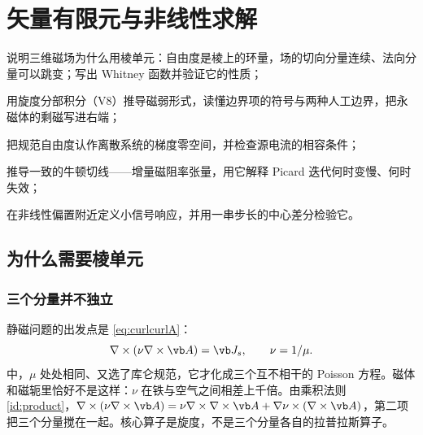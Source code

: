 \chapter{矢量有限元与非线性求解}\label{ch:femvector}

\begin{chapterguide}
\begin{guidegoals}
\item 说明三维磁场为什么用棱单元：自由度是棱上的环量，场的切向分量连续、法向分量可以跳变；写出 Whitney 函数并验证它的性质；
\item 用旋度分部积分（V8）推导磁弱形式，读懂边界项的符号与两种人工边界，把永磁体的剩磁写进右端；
\item 把规范自由度认作离散系统的梯度零空间，并检查源电流的相容条件；
\item 推导一致的牛顿切线——增量磁阻率张量，用它解释 Picard 迭代何时变慢、何时失效；
\item 在非线性偏置附近定义小信号响应，并用一串步长的中心差分检验它。
\end{guidegoals}
\end{chapterguide}

\section{为什么需要棱单元}\label{sec:femvector-edge}

\subsection{三个分量并不独立}
静磁问题的出发点是 \eqref{eq:curlcurlA}：
\begin{equation*}
\nabla\times(\nu\nabla\times\vb A)=\vb J_s,\qquad \nu=1/\mu .
\end{equation*}
 中，$\mu$ 处处相同、又选了库仑规范，它才化成三个互不相干的 Poisson 方程。磁体和磁轭里恰好不是这样：$\nu$ 在铁与空气之间相差上千倍。由乘积法则 \eqref{id:product}，$\nabla\times(\nu\nabla\times\vb A)=\nu\nabla\times\nabla\times\vb A+\nabla\nu\times(\nabla\times\vb A)$，第二项把三个分量搅在一起。核心算子是旋度，不是三个分量各自的拉普拉斯算子。

